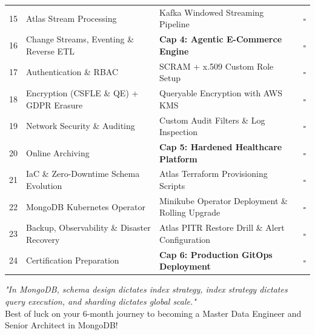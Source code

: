 \documentclass[11pt, a4paper]{article}
\begin{document}
\begin{center}
\begin{longtable}{@{} c l p{7cm} c @{}}
15 & Atlas Stream Processing & Kafka Windowed Streaming Pipeline & $\square$ \\
16 & Change Streams, Eventing \& Reverse ETL & \textbf{Cap 4: Agentic E-Commerce Engine} & $\square$ \\
\midrule
17 & Authentication \& RBAC & SCRAM + x.509 Custom Role Setup & $\square$ \\
18 & Encryption (CSFLE \& QE) + GDPR Erasure & Queryable Encryption with AWS KMS & $\square$ \\
19 & Network Security \& Auditing & Custom Audit Filters \& Log Inspection & $\square$ \\
20 & Online Archiving & \textbf{Cap 5: Hardened Healthcare Platform} & $\square$ \\
\midrule
21 & IaC \& Zero-Downtime Schema Evolution & Atlas Terraform Provisioning Scripts & $\square$ \\
22 & MongoDB Kubernetes Operator & Minikube Operator Deployment \& Rolling Upgrade & $\square$ \\
23 & Backup, Observability \& Disaster Recovery & Atlas PITR Restore Drill \& Alert Configuration & $\square$ \\
24 & Certification Preparation & \textbf{Cap 6: Production GitOps Deployment} & $\square$ \\

\end{longtable}
\end{center}

\vspace{1cm}
\begin{center}
    \textit{"In MongoDB, schema design dictates index strategy, index strategy dictates query execution, and sharding dictates global scale."} \\
    Best of luck on your 6-month journey to becoming a Master Data Engineer and Senior Architect in MongoDB!
\end{center}
\end{document}
